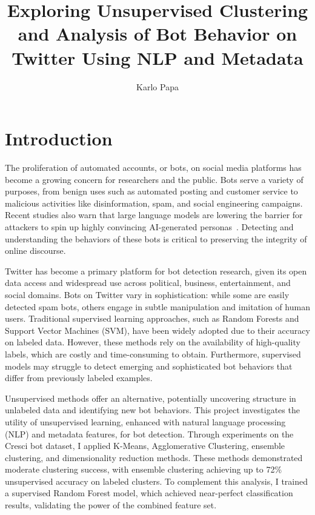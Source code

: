 \documentclass[10pt,twocolumn]{article}
\title{Exploring Unsupervised Clustering and Analysis of Bot Behavior on Twitter Using NLP and Metadata}
\author{Karlo Papa}
\affiliation{Occidental College}
\begin{document}
\maketitle

\section{Introduction}

The proliferation of automated accounts, or bots, on social media platforms has become a growing concern for researchers and the public. Bots serve a variety of purposes, from benign uses such as automated posting and customer service to malicious activities like disinformation, spam, and social engineering campaigns. Recent studies also warn that large language models are lowering the barrier for attackers to spin up highly convincing AI-generated personas~\cite{Adams2017ai,Yu2024the}. Detecting and understanding the behaviors of these bots is critical to preserving the integrity of online discourse.

Twitter has become a primary platform for bot detection research, given its open data access and widespread use across political, business, entertainment, and social domains. Bots on Twitter vary in sophistication: while some are easily detected spam bots, others engage in subtle manipulation and imitation of human users. Traditional supervised learning approaches, such as Random Forests and Support Vector Machines (SVM), have been widely adopted due to their accuracy on labeled data. However, these methods rely on the availability of high-quality labels, which are costly and time-consuming to obtain. Furthermore, supervised models may struggle to detect emerging and sophisticated bot behaviors that differ from previously labeled examples.

Unsupervised methods offer an alternative, potentially uncovering structure in unlabeled data and identifying new bot behaviors. This project investigates the utility of unsupervised learning, enhanced with natural language processing (NLP) and metadata features, for bot detection. Through experiments on the Cresci bot dataset, I applied K-Means, Agglomerative Clustering, ensemble clustering, and dimensionality reduction methods. These methods demonstrated moderate clustering success, with ensemble clustering achieving up to 72\% unsupervised accuracy on labeled clusters. To complement this analysis, I trained a supervised Random Forest model, which achieved near-perfect classification results, validating the power of the combined feature set.
\end{document}

